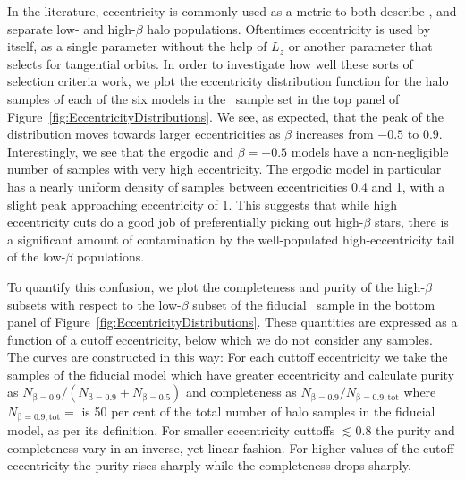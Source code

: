 In the literature, eccentricity is commonly used as a metric to both describe \parencite{myeong19,mackereth19a}, and separate \parencite{mackereth20,naidu20} low- and high-$\beta$ halo populations. Oftentimes eccentricity is used by itself, as a single parameter without the help of $L_{z}$ or another parameter that selects for tangential orbits. In order to investigate how well these sorts of selection criteria work, we plot the eccentricity distribution function for the halo samples of each of the six models in the \survey\ sample set in the top panel of Figure~\ref{fig:EccentricityDistributions}. We see, as expected, that the peak of the distribution moves towards larger eccentricities as $\beta$ increases from $-0.5$ to $0.9$. Interestingly, we see that the ergodic and $\beta=-0.5$ models have a non-negligible number of samples with very high eccentricity. The ergodic model in particular has a nearly uniform density of samples between eccentricities 0.4 and 1, with a slight peak approaching eccentricity of 1. This suggests that while high eccentricity cuts do a good job of preferentially picking out high-$\beta$ stars, there is a significant amount of contamination by the well-populated high-eccentricity tail of the low-$\beta$ populations.



To quantify this confusion, we plot the completeness and purity of the high-$\beta$ subsets with respect to the low-$\beta$ subset of the fiducial \survey\ sample in the bottom panel of Figure~\ref{fig:EccentricityDistributions}. These quantities are expressed as a function of a cutoff eccentricity, below which we do not consider any samples. The curves are constructed in this way: For each cuttoff eccentricity we take the samples of the fiducial model which have greater eccentricity and calculate purity as $N_\mathrm{\beta=0.9}/(N_\mathrm{\beta=0.9}+N_\mathrm{\beta=0.5})$ and completeness as $N_\mathrm{\beta=0.9}/N_\mathrm{\beta=0.9,tot}$ where $N_\mathrm{\beta=0.9,tot}=$ is 50 per cent of the total number of halo samples in the fiducial model, as per its definition. For smaller eccentricity cuttoffs $\lesssim 0.8$ the purity and completeness vary in an inverse, yet linear fashion. For higher values of the cutoff eccentricity the purity rises sharply while the completeness drops sharply.

